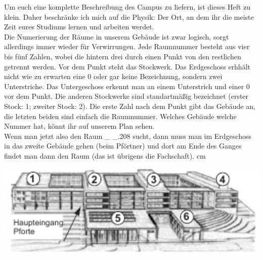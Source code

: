 Um euch eine komplette Beschreibung des Campus zu liefern, ist dieses Heft zu klein.
Daher beschränke ich mich auf die Physik:
Der Ort, an dem ihr die meiste Zeit eures Studiums lernen und arbeiten werdet.\\
Die Numerierung der Räume in unserem Gebäude ist zwar logisch, sorgt allerdings immer wieder für Verwirrungen.
Jede Raumnummer besteht aus vier bis fünf Zahlen, wobei die hintern drei durch einen Punkt von den restlichen getrennt werden.
Vor dem Punkt steht das Stockwerk.
Das Erdgeschoss erhhält nicht wie zu erwarten eine 0 oder gar keine Bezeichnung, sondern zwei Unterstriche.
Das Untergeschoss erkennt man an einem Unterstrich und einer 0 vor dem Punkt.
Die anderen Stockwerke sind standartmäßig bezeichnet (erster Stock: 1; zweiter Stock: 2).
Die erste Zahl nach dem Punkt gibt das Gebäude an, die letzten beiden sind einfach die Raumnummer.
Welches Gebäude welche Nummer hat, könnt ihr auf unserem Plan sehen. \\
Wenn man jetzt also den Raum \_ \_.208 sucht, dann muss man im Erdgeschoss in das zweite Gebäude gehen
(beim Pförtner) und dort am Ende des Ganges findet man dann den Raum (das ist übrigens die Fachschaft).
 cm
\begin{center}
    \includegraphics[width=1.00\textwidth]{bilder/plan.png}
\end{center}
